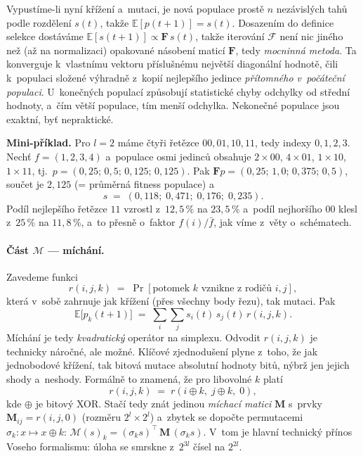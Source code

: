 \documentclass[11pt,a4paper]{article}
\theoremstyle{definition}
\begin{document}
Vypustíme-li nyní křížení a~mutaci, je nová populace prostě $n$ nezávislých
tahů podle rozdělení $s(t)$, takže $\mathbb{E}[p(t+1)] = s(t)$. Dosazením
do definice selekce dostáváme $\mathbb{E}[s(t+1)] \propto \mathbf{F}\,s(t)$,
takže iterování $\mathcal{F}$ není nic jiného než (až na normalizaci) opakované
násobení maticí $\mathbf{F}$, tedy \emph{mocninná metoda}. Ta konverguje k~vlastnímu
vektoru příslušnému největší diagonální hodnotě, čili k~populaci složené
výhradně z~kopií nejlepšího jedince \emph{přítomného v~počáteční populaci}.
U~konečných populací způsobují statistické chyby odchylky od střední hodnoty, a~čím
větší populace, tím menší odchylka. Nekonečné populace jsou exaktní, byť nepraktické.

\textbf{Mini-příklad.} Pro $l = 2$ máme čtyři řetězce $00,01,10,11$, tedy
indexy $0,1,2,3$. Nechť $f = (1, 2, 3, 4)$ a~populace osmi jedinců obsahuje
$2\times 00$, $4\times 01$, $1\times 10$, $1\times 11$, tj.\
$p = (0{,}25;\,0{,}5;\,0{,}125;\,0{,}125)$. Pak
$\mathbf{F}p = (0{,}25;\,1{,}0;\,0{,}375;\,0{,}5)$, součet je $2{,}125$
(= průměrná fitness populace) a
\[
s \;=\; (0{,}118;\; 0{,}471;\; 0{,}176;\; 0{,}235).
\]
Podíl nejlepšího řetězce $11$ vzrostl z~$12{,}5\,\%$ na $23{,}5\,\%$ a~podíl
nejhoršího $00$ klesl z~$25\,\%$ na $11{,}8\,\%$, a~to přesně o~faktor
$f(i)/\bar f$, jak víme z~věty o~schématech.

\paragraph{Část $\mathcal{M}$ --- míchání.} Zavedeme funkci
\[
r(i,j,k) \;=\; \Pr[\text{potomek } k \text{ vznikne z~rodičů } i, j],
\]
která v~sobě zahrnuje jak křížení (přes všechny body řezu), tak mutaci.
Pak
\[
\mathbb{E}\big[p_k(t+1)\big] \;=\; \sum_{i}\sum_{j} s_i(t)\, s_j(t)\, r(i,j,k).
\]
Míchání je tedy \emph{kvadratický} operátor na simplexu. Odvodit $r(i,j,k)$ je
technicky náročné, ale možné. Klíčové zjednodušení plyne z~toho, že jak
jednobodové křížení, tak bitová mutace \uv{nevidí} absolutní hodnoty bitů,
nýbrž jen jejich shody a~neshody. Formálně to znamená, že pro libovolné $k$ platí
\[
r(i,j,k) \;=\; r(i \oplus k,\; j \oplus k,\; 0),
\]
kde $\oplus$ je bitový XOR. Stačí tedy znát jedinou \emph{míchací matici}
$\mathbf{M}$ s~prvky $\mathbf{M}_{ij} = r(i,j,0)$ (rozměru $2^l \times 2^l$)
a~zbytek se dopočte permutacemi $\sigma_k : x \mapsto x \oplus k$:
$\mathcal{M}(s)_k = (\sigma_k s)^{\!\top}\, \mathbf{M}\, (\sigma_k s)$.
V~tom je hlavní technický přínos Voseho formalismu: úloha se smrskne
z~$2^{3l}$ čísel na $2^{2l}$.
\end{document}
